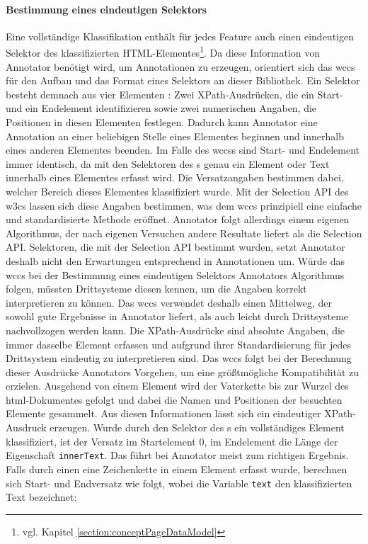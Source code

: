     \paragraph{Bestimmung eines eindeutigen Selektors}
    Eine vollständige Klassifikation enthält für jedes Feature auch einen eindeutigen
    Selektor des klassifizierten HTML-Elementes\footnote{vgl. Kapitel \ref{section:conceptPageDataModel}}.
    Da diese Information von Annotator benötigt wird,
    um Annotationen zu erzeugen,
    orientiert sich das \gls{wccs} für den Aufbau und das Format eines Selektors
    an dieser Bibliothek.
    Ein Selektor besteht demnach aus vier Elementen
    \cite[Kapitel "`Annotation format"']{annotator:documentation}:
    Zwei XPath-Ausdrücken, die ein Start- und ein Endelement identifizieren
    sowie zwei numerischen Angaben, die Positionen in diesen Elementen festlegen.
    Dadurch kann Annotator eine Annotation an einer beliebigen Stelle eines Elementes beginnen
    und innerhalb eines anderen Elementes beenden.
    Im Falle des \glspl{wccs} sind Start- und Endelement immer identisch,
    da mit den Selektoren des {\classificationModel}s genau ein Element
    oder Text innerhalb eines Elementes erfasst wird.
    Die Versatzangaben bestimmen dabei, welcher Bereich dieses Elementes klassifiziert wurde.
    Mit der Selection API des \glspl{w3c} \cite{w3c:selectionAPI} lassen sich diese Angaben bestimmen,
    was dem \gls{wccs} prinzipiell eine einfache und standardisierte Methode eröffnet.
    Annotator folgt allerdings einem eigenen Algorithmus,
    der nach eigenen Versuchen andere Resultate liefert als die Selection API.
    Selektoren, die mit der Selection API bestimmt wurden,
    setzt Annotator deshalb nicht den Erwartungen entsprechend in Annotationen um.
    Würde das \gls{wccs} bei der Bestimmung eines eindeutigen Selektors Annotators
    Algorithmus folgen, müssten Drittsysteme diesen kennen,
    um die Angaben korrekt interpretieren zu können.
    Das \gls{wccs} verwendet deshalb einen Mittelweg,
    der sowohl gute Ergebnisse in Annotator liefert,
    als auch leicht durch Drittsysteme nachvollzogen werden kann.
    Die XPath-Ausdrücke sind absolute Angaben, die immer dasselbe Element erfassen und aufgrund ihrer Standardisierung
    für jedes Drittsystem eindeutig zu interpretieren sind.
    Das \gls{wccs} folgt bei der Berechnung dieser Ausdrücke Annotators Vorgehen,
    um eine größtmögliche Kompatibilität zu erzielen.
    Ausgehend von einem Element wird der Vaterkette bis zur Wurzel des \gls{html}-Dokumentes
    gefolgt und dabei die Namen und Positionen der besuchten Elemente gesammelt.
    Aus diesen Informationen lässt sich ein eindeutiger XPath-Ausdruck erzeugen.
    Wurde durch den Selektor des {\classificationModel}s ein vollständiges Element klassifiziert,
    ist der Versatz im Startelement 0, im Endelement die Länge der Eigenschaft \texttt{innerText}.
    Das führt bei Annotator meist zum richtigen Ergebnis.
    Falls durch einen {\xpathSelector} eine Zeichenkette in einem Element erfasst wurde,
    berechnen sich Start- und Endversatz wie folgt, wobei die Variable \texttt{text} den klassifizierten Text bezeichnet:

